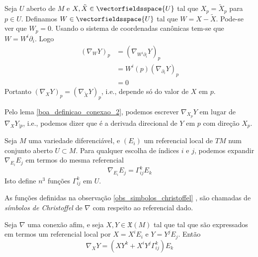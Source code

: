 \begin{demonstracao}
	Seja $U$ aberto de $M$ e $X, \tilde{X} \in \vectorfieldsspace{U}$ tal que $X_p = \tilde{X}_p$ para $p \in U$. Definamos $W \in \vectorfieldsspace{U}$ tal que $W = X - \tilde{X}$. Pode-se ver que $W_p = 0$. Usando o sistema de coordenadas canônicas tem-se que $W = W^i \partial_i$. Logo
	\begin{align*}
		(\nabla_W Y)_p &= (\nabla_{W^i \partial_i} Y)_p\\
		&=   W^i(p) (\nabla_{\partial_i} Y)_p\\
		&= 0
	\end{align*}
	Portanto $(\nabla_X Y)_p = (\nabla_{\tilde{X}} Y)_p$, i.e., depende só do valor de $X$ em $p$.
\end{demonstracao}

\begin{observacao}
	Pelo lema \ref{boa_definicao_conexao_2}, podemos escrever $\nabla_{X_p} Y$ em lugar de $\nabla_X Y_{|p}$, i.e., podemos dizer que é a derivada direcional de $Y$ em $p$ com direção $X_p$.
\end{observacao}



\begin{observacao}\label{obs_simbolos_christoffel}
	Seja $M$ uma variedade diferenciável, e $(E_i)$ um referencial local de $TM$ num conjunto aberto $U \subset M$. Para qualquer escolha de índices $i$ e $j$, podemos expandir $\nabla_{E_i} E_j$ em termos do mesma referencial
	\begin{equation*}
		\nabla_{E_i} E_j = \Gamma^k_{ij} E_k
	\end{equation*}
	Isto define $n^3$ funções $\Gamma^k_{ij}$ em $U$.
\end{observacao}

\begin{definicao} 
	As funções definidas na observação \ref{obs_simbolos_christoffel} , são chamadas de \emph{símbolos de Christoffel} de $\nabla$ com respeito ao referencial dado.
\end{definicao}

\begin{lema}\label{conexiones lineales en función de símbolos de Chritoffel}
	Seja $\nabla$ uma conexão afim, e seja $X,Y \in \mathfrak{X}(M)$ tal que tal que são expressados em termos um referencial local por $X = X^i E_i$ e $Y = Y^j E_j$. Então
	\begin{equation*}
		\nabla_X Y = \left( X Y^k + X^i Y^j \Gamma^k_{ij} \right) E_k
	\end{equation*}
\end{lema}

